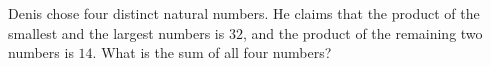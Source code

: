 Denis chose four distinct natural numbers. He claims that the product of the smallest and the largest numbers is $32$, and the product of the remaining two numbers is $14$. What is the sum of all four numbers?
